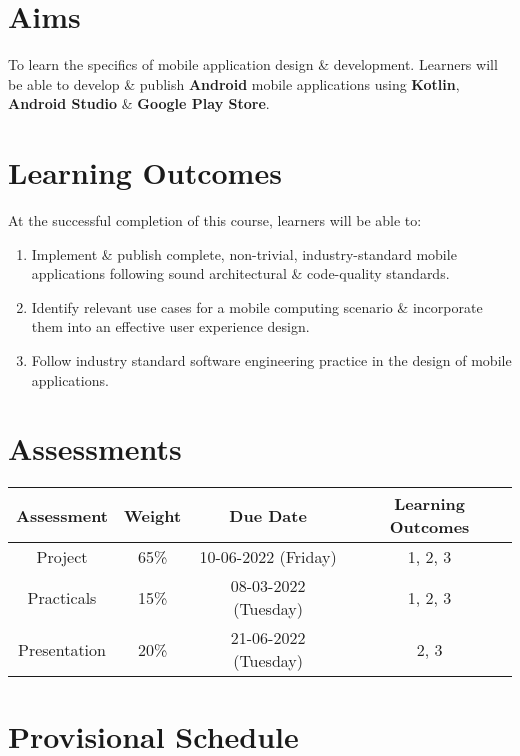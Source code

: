 \documentclass{article}
\begin{document}
\section*{Aims}
To learn the specifics of mobile application design \& development. Learners will be able to develop \& publish \textbf{Android} mobile applications using \textbf{Kotlin}, \textbf{Android Studio} \& \textbf{Google Play Store}.

\section*{Learning Outcomes}
At the successful completion of this course, learners will be able to:
\begin{enumerate}
	\item Implement \& publish complete, non-trivial, industry-standard mobile applications following sound architectural \& code-quality standards.
	\item Identify relevant use cases for a mobile computing scenario \& incorporate them into an effective user experience design.
	\item Follow industry standard software engineering practice in the design of mobile applications.
\end{enumerate}

\section*{Assessments}
\renewcommand{\arraystretch}{1.5}
\begin{tabular}{|c|c|c|c|}
	\hline
	\textbf{Assessment} & \textbf{Weight} & \textbf{Due Date}    & \textbf{Learning Outcomes} \\ \hline
	Project             & 65\%            & 10-06-2022 (Friday)  & 1, 2, 3                    \\ \hline
	Practicals          & 15\%            & 08-03-2022 (Tuesday) & 1, 2, 3                    \\ \hline
	Presentation        & 20\%            & 21-06-2022 (Tuesday) & 2, 3                       \\ \hline
\end{tabular}

\section*{Provisional Schedule}
\end{document}
